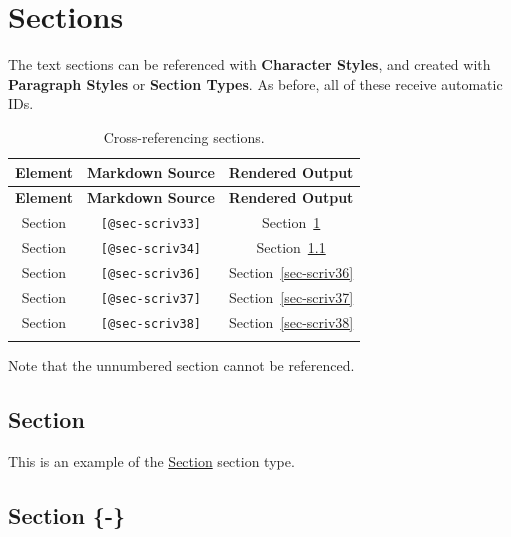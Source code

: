 \documentclass[
  12pt,
  a4paper,
  oneside,
  numbers=noenddot,
  titlepage,
  toclink=all,
  toc=bibliography]{scrbook}
\theoremstyle{definition}
\theoremstyle{definition}
\theoremstyle{definition}
\theoremstyle{plain}
\theoremstyle{plain}
\theoremstyle{plain}
\theoremstyle{plain}
\theoremstyle{plain}
\theoremstyle{remark}
\begin{document}
\newpage{}

\hypertarget{sec-scriv33}{%
\section{Sections}\label{sec-scriv33}}

The text sections can be referenced with \textbf{Character Styles}, and
created with \textbf{Paragraph Styles} or \textbf{Section Types}. As
before, all of these receive automatic IDs.

\hypertarget{tbl-scriv33}{}
\begin{longtable}[]{@{}ccc@{}}
\toprule\noalign{}
\textbf{Element} & \textbf{Markdown Source} & \textbf{Rendered
Output} \\
\midrule\noalign{}
\endfirsthead
\toprule\noalign{}
\textbf{Element} & \textbf{Markdown Source} & \textbf{Rendered
Output} \\
\midrule\noalign{}
\endhead
\bottomrule\noalign{}
\endlastfoot
Section & \texttt{{[}@sec-scriv33{]}} &
\protect\hypertarget{cite_87}{}{\label{cite_87}Section~\ref{sec-scriv33}} \\
Section & \texttt{{[}@sec-scriv34{]}} &
\protect\hypertarget{cite_88}{}{\label{cite_88}Section~\ref{sec-scriv34}} \\
Section & \texttt{{[}@sec-scriv36{]}} &
\protect\hypertarget{cite_89}{}{\label{cite_89}Section~\ref{sec-scriv36}} \\
Section & \texttt{{[}@sec-scriv37{]}} &
\protect\hypertarget{cite_90}{}{\label{cite_90}Section~\ref{sec-scriv37}} \\
Section & \texttt{{[}@sec-scriv38{]}} &
\protect\hypertarget{cite_91}{}{\label{cite_91}Section~\ref{sec-scriv38}} \\
\caption{\label{tbl-scriv33}Cross-referencing sections.}\tabularnewline
\end{longtable}

Note that the unnumbered section cannot be referenced.

\hypertarget{sec-scriv34}{%
\subsection{Section}\label{sec-scriv34}}

This is an example of the \ul{Section} section type.

\hypertarget{sec-scriv35}{%
\subsection*{Section \{-\}}\label{sec-scriv35}}
\end{document}
